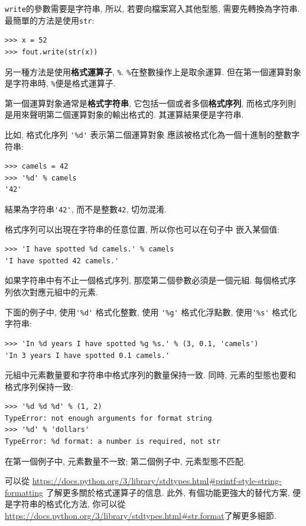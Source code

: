 \documentclass[10pt]{book}
\begin{document}
{\tt write}的參數需要是字符串, 所以, 若要向檔案寫入其他型態, 
需要先轉換為字符串. 最簡單的方法是使用{\tt str}:

\begin{verbatim}
>>> x = 52
>>> fout.write(str(x))
\end{verbatim}
%
另一種方法是使用{\bf 格式運算子}, {\tt \%}. 
{\tt \%}在整數操作上是取余運算. 
但在第一個運算對象是字符串時, {\tt \%}便是格式運算子. 

第一個運算對象通常是{\bf 格式字符串}, 它包括一個或者多個{\bf 格式序列}, 
而格式序列則是用來聲明第二個運算對象的輸出格式的. 
其運算結果便是字符串. 

比如, 格式化序列 \verb"'%d'" 表示第二個運算對象
應該被格式化為一個十進制的整數字符串:

\begin{verbatim}
>>> camels = 42
>>> '%d' % camels
'42'
\end{verbatim}
%
結果為字符串\verb"'42'", 而不是整數{\tt 42}, 切勿混淆.

格式序列可以出現在字符串的任意位置, 所以你也可以在句子中
嵌入某個值:

\begin{verbatim}
>>> 'I have spotted %d camels.' % camels
'I have spotted 42 camels.'
\end{verbatim}
%
如果字符串中有不止一個格式序列, 那麼第二個參數必須是一個元組. 
每個格式序列依次對應元組中的元素. 

下面的例子中, 使用\verb"'%d'" 格式化整數, 
使用 \verb"'%g'" 格式化浮點數, 
使用\verb"'%s'" 格式化字符串:

\begin{verbatim}
>>> 'In %d years I have spotted %g %s.' % (3, 0.1, 'camels')
'In 3 years I have spotted 0.1 camels.'
\end{verbatim}
%
元組中元素數量要和字符串中格式序列的數量保持一致. 
同時, 元素的型態也要和格式序列保持一致:

\begin{verbatim}
>>> '%d %d %d' % (1, 2)
TypeError: not enough arguments for format string
>>> '%d' % 'dollars'
TypeError: %d format: a number is required, not str
\end{verbatim}
%
在第一個例子中, 元素數量不一致;
第二個例子中, 元素型態不匹配.

可以從
\url{https://docs.python.org/3/library/stdtypes.html#printf-style-string-formatting}
了解更多關於格式運算子的信息. 
此外, 有個功能更強大的替代方案, 便是字符串的格式化方法, 你可以從
\url{https://docs.python.org/3/library/stdtypes.html#str.format}了解更多細節. 
\end{document}
